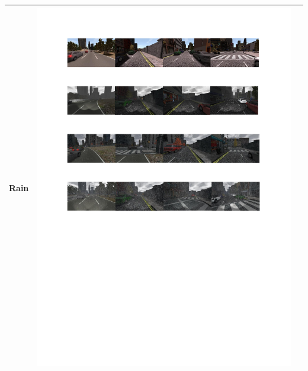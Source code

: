 \documentclass{svproc}
\begin{document}
\begin{table}[!t]
\begin{tabular}{|C{1.5cm}|c|C{8.5cm}|}
	Rain &  \begin{minipage}{.9\textwidth}\includegraphics[scale=.5,trim=2cm 16.5cm 2cm 10.5cm,clip]{examples.pdf}\end{minipage} \\ \hline

\end{tabular}
\end{table}
\end{document}
